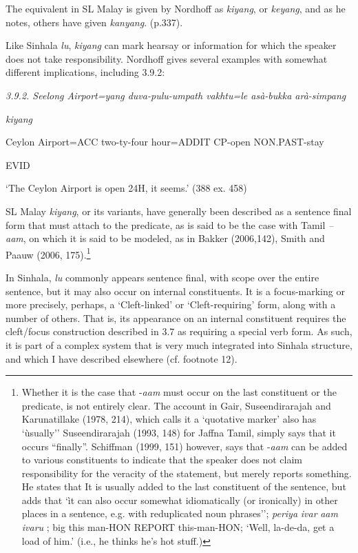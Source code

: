 \documentclass[letterpaper]{article}
\begin{document}
 The equivalent in SL Malay is given by Nordhoff as \textit{kiyang}, or \textit{keyang}, and as he notes, others have given \textit{kanyang}. (p.337).

  Like Sinhala \textit{lu}, \textit{kiyang} can mark hearsay or information for which the speaker does not take responsibility. Nordhoff gives several examples with somewhat different implications, including 3.9.2:

{\itshape
 3.9.2. 
\ea
\gll Seelong Airport=yang duva-pulu-umpath vakhtu=le asà-bukka arà-simpang}

{\itshape
   kiyang}

 Ceylon Airport=ACC two-ty-four  hour=ADDIT CP-open  NON.PAST-stay 

  EVID

 `The Ceylon Airport is open 24H, it seems.' (388 ex. 458)

 SL Malay \textit{kiyang}, or its variants, have generally been described as a sentence final form that must attach to the predicate, as is said to be the case with Tamil \textit{--}\textit{aam}, on which it is said to be modeled, as in Bakker (2006,142), Smith and Paauw (2006, 175).\footnote{Whether
  it is the case that -\textit{aam} must occur on the last constituent or the predicate, is not entirely clear. The account in Gair, Suseendirarajah and Karunatillake (1978, 214), which calls it a `quotative marker' also has `ùsually'' Suseendirarajah (1993, 148) for Jaffna Tamil, simply says that it occurs ``finally''. Schiffman (1999, 151) however, says that -\textit{aam} can be added to various constituents to indicate that the speaker does not claim responsibility for the veracity of the statement, but merely reports something. He states that It is usually added to the last constituent of the sentence, but adds that `ìt can also occur somewhat idiomatically (or ironically) in other places in a sentence, e.g. with reduplicated noun phrases''; \textit{periya} \textit{ivar} \textit{aam} \textit{ivaru} ; big this man-HON REPORT this-man-HON; `Well, la-de-da, get a load of him.' (i.e., he thinks he's hot stuff.)}

In Sinhala, \textit{lu} commonly appears sentence final, with scope over the entire sentence, but it may also occur on internal constituents.  It is a focus-marking or more precisely, perhaps, a `Cleft-linked' or `Cleft-requiring' form, along with a number of others. That is, its appearance on an internal constituent requires the cleft/focus construction described in  3.7 as requiring a special verb form. As such, it is part of a complex system that is very much integrated into Sinhala structure, and which I have described elsewhere (cf. footnote 12).
\end{document}
